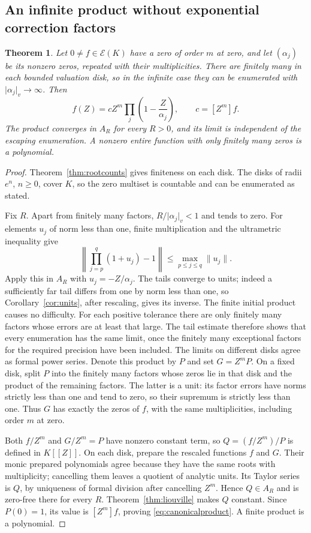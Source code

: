 \documentclass[11pt,a4paper]{article}
\numberwithin{equation}{section}
\newtheorem{theorem}{Theorem}[section]
\theoremstyle{definition}
\theoremstyle{remark}
\newcommand{\EE}{\mathcal E}
\newcommand{\norm}[1]{\lVert#1\rVert}
\newcommand{\vabs}[1]{\lvert#1\rvert_v}
\begin{document}
\subsection{An infinite product without exponential correction factors}
\begin{theorem}\label{thm:canonicalproduct}
Let $0\ne f\in\EE(K)$ have a zero of order $m$ at zero, and let
$(\alpha_j)$ be its nonzero zeros, repeated with their multiplicities.
There are finitely many in each bounded valuation disk, so in the infinite
case they can be enumerated with $\vabs{\alpha_j}\to\infty$. Then
\begin{equation}\label{eq:canonicalproduct}
 f(Z)=cZ^m\prod_j\left(1-\frac Z{\alpha_j}\right),
 \qquad c=[Z^m]f.
\end{equation}
The product converges in $A_R$ for every $R>0$, and its limit is independent
of the escaping enumeration. A nonzero entire function with only finitely
many zeros is a polynomial.
\end{theorem}
\begin{proof}
Theorem~\ref{thm:rootcounts} gives finiteness on each disk. The disks of
radii $e^n$, $n\ge0$, cover $K$, so the zero multiset is countable and can be
enumerated as stated.

Fix $R$. Apart from finitely many factors, $R/\vabs{\alpha_j}<1$ and tends
to zero. For elements $u_j$ of norm less than one, finite multiplication and
the ultrametric inequality give
\[
 \left\|\prod_{j=p}^q(1+u_j)-1\right\|
 \le\max_{p\le j\le q}\norm{u_j}.
\]
Apply this in $A_R$ with $u_j=-Z/\alpha_j$. The tails converge to units;
indeed a sufficiently far tail differs from one by norm less than one, so
Corollary~\ref{cor:units}, after rescaling, gives its inverse.
The finite initial product causes no difficulty. For each positive tolerance
there are only finitely many factors whose errors are at least that large. The tail estimate
therefore shows that every enumeration has the same limit, once the finitely
many exceptional factors for the required precision have been included.
The limits on different disks agree as formal power series. Denote this product by $P$ and set
$G=Z^mP$. On a fixed disk, split $P$ into the finitely many factors whose
zeros lie in that disk and the product of the remaining factors. The latter
is a unit: its factor errors have norms strictly less than one and tend to
zero, so their supremum is strictly less than one. Thus $G$ has exactly
the zeros of $f$, with the same multiplicities, including order $m$ at zero.

Both $f/Z^m$ and $G/Z^m=P$ have nonzero constant term, so
$Q=(f/Z^m)/P$ is defined in $K[[Z]]$. On each disk, prepare the rescaled
functions $f$ and $G$. Their monic prepared polynomials agree because they
have the same roots with multiplicity; cancelling them leaves a quotient
of analytic units. Its Taylor series is $Q$, by uniqueness of formal
division after cancelling $Z^m$. Hence $Q\in A_R$ and is zero-free there
for every $R$. Theorem~\ref{thm:liouville} makes $Q$ constant.
Since $P(0)=1$, its value is $[Z^m]f$, proving
\eqref{eq:canonicalproduct}. A finite product is a polynomial.
\end{proof}
\end{document}
